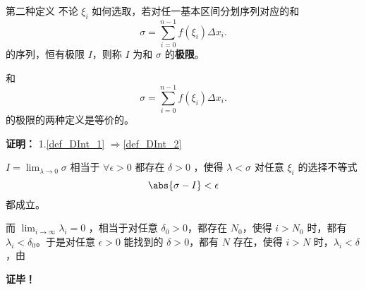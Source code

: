 \begin{definition}{第二种定义}
不论 $\xi_i$ 如何选取，若对任一基本区间分划序列对应的和 
\begin{equation}
\sigma=\sum_{i=0}^{n-1}f(\xi_i)\Delta x_i.
\end{equation}
的序列，恒有极限 $I$，则称 $I$ 为和 $\sigma$ 的\textbf{极限}。
\end{definition}
\begin{theorem}{}
和 
\begin{equation}
\sigma=\sum_{i=0}^{n-1}f(\xi_i)\Delta x_i.
\end{equation}
的极限的两种定义是等价的。
\end{theorem}
\textbf{证明：}
1.\autoref{def_DInt_1} $\Rightarrow$\autoref{def_DInt_2} 

$I=\lim_{\lambda\rightarrow0}\sigma$ 相当于 $\forall\epsilon>0$ 都存在 $\delta>0$ ，使得 $\lambda<\sigma$ 对任意 $\xi_i$ 的选择不等式
\begin{equation}
\abs{\sigma-I}<\epsilon
\end{equation}
都成立。

而 $\lim_{i\rightarrow\infty}\lambda_i=0$ ，相当于对任意 $\delta_0>0$，都存在 $N_0$，使得 $i>N_0$ 时，都有 $\lambda_i<\delta_0$。于是对任意 $\epsilon>0$ 能找到的 $\delta>0$，都有 $N$ 存在，使得 $i>N$ 时，$\lambda_i<\delta$，由


\textbf{证毕！}